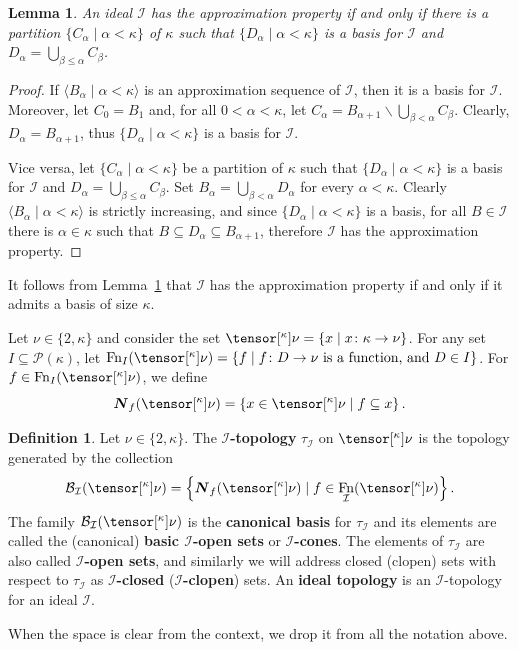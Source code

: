 \documentclass{amsart}
\numberwithin{equation}{section}
\newcommand{\B}{\mathcal{B}}
\newcommand{\I}{\mathcal{I}}
\newcommand{\pre}[2]{\tensor[^{#1}]{#2}{}}
\newcommand{\seq}[2]{\langle #1 \mid #2 \rangle}
\newcommand{\Nbhd}{\boldsymbol{N}}
\newcommand{\markdef}[1]{\textbf{#1}}
\newcommand{\1}{\mathbf{I}}
\newcommand{\2}{\mathbf{II}}
\renewcommand{\a}{\alpha}
\renewcommand{\k}{\kappa}
\newcommand{\pow}{\mathscr{P}}
\DeclareMathOperator{\Fn}{Fn}
\newcommand{\clopen}[1]{\Nbhd_{#1}}
\newtheorem{lemma}[theorem]{Lemma}
\theoremstyle{definition}
\newtheorem{definition}[theorem]{Definition}
\theoremstyle{remark}
\begin{document}
\begin{lemma}\label{lem:approximation_property}
    An ideal $\mathcal{I}$ has the approximation property if and only if there is a partition $\{ C_\alpha \mid \alpha<\kappa\}$ of $\kappa$ such that $\{D_\alpha\mid \alpha<\kappa\}$ is a basis for $\mathcal{I}$ and $D_\alpha=\bigcup_{\beta\leq \alpha}C_\beta$.
\end{lemma}
\begin{proof}
    If $\seq{ B_\alpha}{\alpha<\kappa}$ is an approximation sequence of $\mathcal{I}$, then it is a basis for $\mathcal{I}$. Moreover, let $C_0=B_1$ and, for all $0<\alpha<\kappa$, let $C_{\alpha}=B_{\alpha+1}\backslash \bigcup_{\beta< \alpha}C_\beta$. Clearly, $D_\alpha=B_{\alpha+1}$, thus $\{D_\alpha\mid \alpha<\kappa\}$ is a basis for $\mathcal{I}$.

    Vice versa, let $\{ C_\alpha \mid \alpha<\kappa\}$ be a partition of $\kappa$ such that $\{D_\alpha\mid \alpha<\kappa\}$ is a basis for $\mathcal{I}$ and $D_\alpha=\bigcup_{\beta\leq \alpha}C_\beta$. Set $B_\alpha=\bigcup_{\beta<\alpha}D_\alpha$ for every \(\a<\k\). Clearly $\seq{ B_\alpha}{\alpha<\kappa}$ is strictly increasing, and since $\{D_\alpha\mid \alpha<\kappa\}$ is a basis, for all $B\in \mathcal{I}$ there is $\alpha\in \kappa$ such that $B\subseteq D_\alpha\subseteq B_{\alpha+1}$, therefore $\mathcal{I}$ has the approximation property.
\end{proof}

It follows from Lemma~\ref{lem:approximation_property} that $\mathcal{I}$ has the approximation property if and only if it admits a basis of size $\k$.



\medskip
Let \(\nu \in \{2,\k\}\) and consider the set $\pre{\k}{\nu}=\{x \mid x\colon \k \to \nu\}$. 
For any set \(I\subseteq \pow(\k)\), let \(\Fn_I(\pre{\k}{\nu})=\{f \mid f\colon D \to \nu \text{ is a function, and } D \in I\}\).
For \(f\in\Fn_I(\pre{\k}{\nu})\), we define
 \[
 \clopen{f}(\pre{\k}{\nu})=\left\lbrace  x \in \pre{\k}{\nu} \mid  f \subseteq x \right\rbrace. 
 \]
 \begin{definition}\label{def:ideal_topology}
 	Let \(\nu \in \{2,\k\}\). The \markdef{\(\I\)-topology} \(\tau_\I\) on \(\pre{\k}{\nu}\) is the topology generated by the collection
    \[
    \B_\I(\pre{\k}{\nu})=\left\lbrace \clopen{f}(\pre{\k}{\nu})  \mid  f \in \Fn_\I(\pre{\k}{\nu}) \right\rbrace. 
    \]
The family \(\B_\I(\pre{\k}{\nu})\) is the \markdef{canonical basis} for \(\tau_\I\) and its elements are called the (canonical) \markdef{basic \(\I\)-open sets} or \markdef{\(\I\)-cones}.
The elements of \(\tau_\I\) are also called \markdef{\(\I\)-open sets}, and similarly we will address closed (clopen) sets with respect to \(\tau_\I\) as \markdef{\(\I\)-closed} (\markdef{\(\I\)-clopen}) sets.  An \markdef{ideal topology} is an \(\I\)-topology for an ideal \(\I\).
\end{definition}
When the space is clear from the context, we drop it from all the notation above.%
\end{document}

